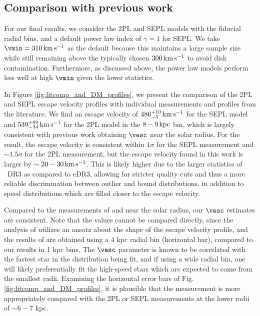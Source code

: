 \subsection{Comparison with previous work}

For our final results, we consider the 2PL and SEPL models with the fiducial radial bins, and a default power law index of $\gamma =1$ for SEPL. We take $\vmin=310\,\rm{km\,s^{-1}}$ as the default because this maintains a large sample size while still remaining above the typically chosen $300\,\rm{km\,s^{-1}}$ to avoid disk contamination. Furthermore, as discussed above, the power law models perform less well at high $\vmin$ given the lower statistics. 

In Figure \ref{fig:litcomp_and_DM_profiles}, we present the comparison of the 2PL and SEPL escape velocity profiles with individual measurements and profiles from the literature. We find an escape velocity of $486^{+10}_{-5}\,\rm{km\,s^{-1}}$ for the SEPL model and $539^{+69}_{-34}\,\rm{km\,s^{-1}}$ for the 2PL model in the $8-9\,\rm{kpc}$ bin, which is largely consistent with previous work obtaining $\vesc$ near the solar radius. For the \cite{Necib2022} result, the escape velocity is consistent within $1\sigma$ for the SEPL measurement and $\sim 1.5\sigma$ for the 2PL measurement, but the escape velocity found in this work is larger by $\sim20-30\,\rm{km\,s^{-1}}$. This is likely higher due to the larger statistics of \Gaia~DR3 as compared to eDR3, allowing for stricter quality cuts and thus a more reliable discrimination between outlier and bound distributions, in addition to speed distributions which are filled closer to the escape velocity.

Compared to the measurements of \cite{deason:2019} and \cite{Koppelman2021} near the solar radius, our $\vesc$ estimates are consistent. Note that the values cannot be compared directly, since the analysis of \cite{deason:2019} utilizes an ansatz about the shape of the escape velocity profile, and the results of \cite{Koppelman2021} are obtained using a 4 kpc radial bin (horizontal bar), compared to our results in 1 kpc bins. The $\vesc$ parameter is known to be correlated with the fastest star in the distribution being fit, and if using a wide radial bin, one will likely preferentially fit the high-speed stars which are expected to come from the smallest radii. Examining the horizontal error bars of Fig. \ref{fig:litcomp_and_DM_profiles}, it is plausible that the \cite{Koppelman2021} measurement is more appropriately compared with the 2PL or SEPL measurements at the lower radii of $\sim6-7$ kpc.

